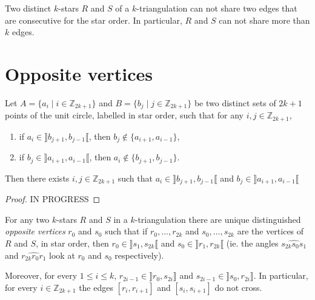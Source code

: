 \documentclass[12pt]{amsart}
\begin{document}
\begin{corollary}\label{commonedges}
Two distinct $k$-stars $R$ and $S$ of a $k$-triangulation can not share two edges that are consecutive for the star order. In particular, $R$ and $S$ can not share more than $k$ edges.
\end{corollary}


\section{Opposite vertices}

\begin{lemma}
Let $A=\{a_i\;|\; i\in\mathbb{Z}_{2k+1}\}$ and $B=\{b_j\;|\; j\in\mathbb{Z}_{2k+1}\}$ be two distinct sets of $2k+1$ points of the unit circle, labelled in star order, such that for any $i,j\in\mathbb{Z}_{2k+1}$,
\begin{enumerate}
\item if $a_i\in\rrbracket b_{j+1},b_{j-1}\llbracket$, then $b_j\notin\{a_{i+1},a_{i-1}\}$,
\item if $b_j\in\rrbracket a_{i+1},a_{i-1}\llbracket$, then $a_i\notin\{b_{j+1},b_{j-1}\}$.
\end{enumerate}
Then there exists $i,j\in\mathbb{Z}_{2k+1}$ such that $a_i\in\rrbracket b_{j+1},b_{j-1}\llbracket$ and $b_j\in\rrbracket a_{i+1},a_{i-1}\llbracket$
\end{lemma}

\begin{proof}
IN PROGRESS
\end{proof}

\begin{theorem}\label{oppositevertices}
For any two $k$-stars $R$ and $S$ in a $k$-triangulation there are unique distinguished \emph{opposite vertices} $r_0$ and $s_0$ such that if $r_0,\dots,r_{2k}$ and $s_0,\dots, s_{2k}$ are the vertices of $R$ and $S$, in star order, then $r_0\in\rrbracket s_1,s_{2k}\llbracket$ and $s_0\in\rrbracket r_1,r_{2k}\llbracket$ (ie. the angles $\widehat{s_{2k}s_0s_1}$ and $\widehat{r_{2k}r_0r_1}$ look at $r_0$ and $s_0$ respectively).

Moreover, for every $1\le i\le k$, $r_{2i-1}\in\rrbracket r_0,s_{2i}\rrbracket$ and $s_{2i-1}\in\rrbracket s_0,r_{2i}\rrbracket$.
In particular, for every $i\in\mathbb{Z}_{2k+1}$ the edges $[r_i,r_{i+1}]$ and $[s_i,s_{i+1}]$ do not cross.
\end{theorem}
\end{document}
